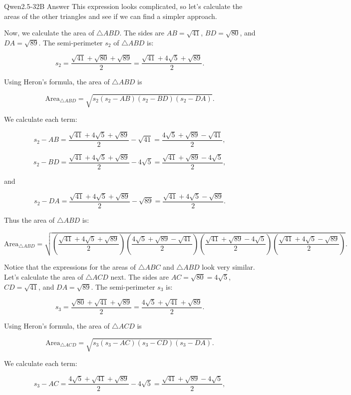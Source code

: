 \begin{answerbox}{Qwen2.5-32B Answer}
This expression looks complicated, so let's calculate the areas of the other triangles and see if we can find a simpler approach.

Now, we calculate the area of $\triangle ABD$. The sides are $AB = \sqrt{41}$, $BD = \sqrt{80}$, and $DA = \sqrt{89}$. The semi-perimeter $s_2$ of $\triangle ABD$ is:

\[ s_2 = \frac{\sqrt{41} + \sqrt{80} + \sqrt{89}}{2} = \frac{\sqrt{41} + 4 \sqrt{5} + \sqrt{89}}{2}. \]

Using Heron's formula, the area of $\triangle ABD$ is

\[ \text{Area}_{\triangle ABD} = \sqrt{s_2 (s_2 - AB)(s_2 - BD)(s_2 - DA)}. \]

We calculate each term:

\[ s_2 - AB = \frac{\sqrt{41} + 4 \sqrt{5} + \sqrt{89}}{2} - \sqrt{41} = \frac{4 \sqrt{5} + \sqrt{89} - \sqrt{41}}{2}, \]

\[ s_2 - BD = \frac{\sqrt{41} + 4 \sqrt{5} + \sqrt{89}}{2} - 4 \sqrt{5} = \frac{\sqrt{41} + \sqrt{89} - 4 \sqrt{5}}{2}, \]

\end{answerbox}

and

\[ s_2 - DA = \frac{\sqrt{41} + 4 \sqrt{5} + \sqrt{89}}{2} - \sqrt{89} = \frac{\sqrt{41} + 4 \sqrt{5} - \sqrt{89}}{2}. \]

Thus the area of $\triangle ABD$ is:

\[ \text{Area}_{\triangle ABD} = \sqrt{\left(\frac{\sqrt{41} + 4 \sqrt{5} + \sqrt{89}}{2}\right) \left(\frac{4 \sqrt{5} + \sqrt{89} - \sqrt{41}}{2}\right) \left(\frac{\sqrt{41} + \sqrt{89} - 4 \sqrt{5}}{2}\right) \left(\frac{\sqrt{41} + 4 \sqrt{5} - \sqrt{89}}{2}\right)}. \]

Notice that the expressions for the areas of $\triangle ABC$ and $\triangle ABD$ look very similar. Let's calculate the area of $\triangle ACD$ next. The sides are $AC = \sqrt{80} = 4\sqrt{5}$, $CD = \sqrt{41}$, and $DA = \sqrt{89}$. The semi-perimeter $s_3$ is:

\[ s_3 = \frac{\sqrt{80} + \sqrt{41} + \sqrt{89}}{2} = \frac{4 \sqrt{5} + \sqrt{41} + \sqrt{89}}{2}. \]

Using Heron's formula, the area of $\triangle ACD$ is

\[ \text{Area}_{\triangle ACD} = \sqrt{s_3 (s_3 - AC)(s_3 - CD)(s_3 - DA)}. \]

We calculate each term:

\[ s_3 - AC = \frac{4 \sqrt{5} + \sqrt{41} + \sqrt{89}}{2} - 4 \sqrt{5} = \frac{\sqrt{41} + \sqrt{89} - 4 \sqrt{5}}{2}, \]

